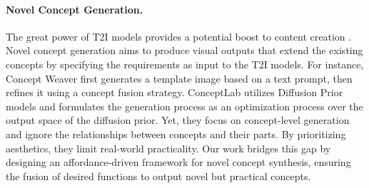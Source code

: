 \paragraph{\textbf{Novel Concept Generation.}}
The great power of T2I models provides a potential boost to content creation \citep{ko2023large, rangwani2024crafting, sankar2024novelideagenerationtool, rahman2024visual, tang2024lgm}. Novel concept generation aims to produce visual outputs that extend the existing concepts by specifying the requirements as input to the T2I models. For instance, Concept Weaver \citep{kwon2024concept} first generates a template image based on a text prompt, then refines it using a concept fusion strategy. ConceptLab \citep{richardson2024conceptlab} utilizes Diffusion Prior models and formulates the generation process as an optimization process over the output space of the diffusion prior. Yet, they focus on concept-level generation and ignore the relationships between concepts and their parts. By prioritizing aesthetics, they limit real-world practicality. Our work bridges this gap by designing an affordance-driven framework for novel concept synthesis, ensuring the fusion of desired functions to output novel but practical concepts.


